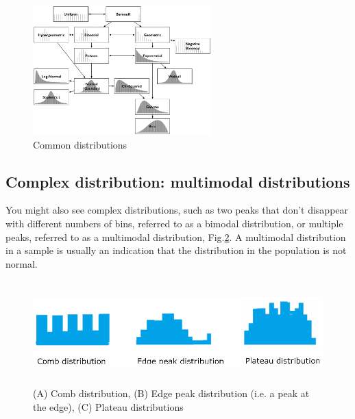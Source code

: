 \begin{figure}[hbt]
  \centerline{\includegraphics[height=5cm,
    angle=0]{./images/common_distributions.eps}}
\caption{Common distributions}
\label{fig:common_distributions}
\end{figure}


\subsection{Complex distribution: multimodal distributions}
\label{sec:multimodal-distributions}

You might also see complex distributions, such as two peaks that don’t disappear
with different numbers of bins, referred to as a bimodal distribution, or
multiple peaks, referred to as a multimodal distribution,
Fig.\ref{fig:multimodal_distributions}. A multimodal distribution in a sample is
usually an indication that the distribution in the population is not normal.

\begin{figure}[hbt]
  \centerline{\includegraphics[height=4cm,
    angle=0]{./images/multimodal_distributions.eps}}
\caption{(A) Comb distribution, (B) Edge peak distribution (i.e. a peak at the edge), (C) Plateau distributions}
\label{fig:multimodal_distributions}
\end{figure}

